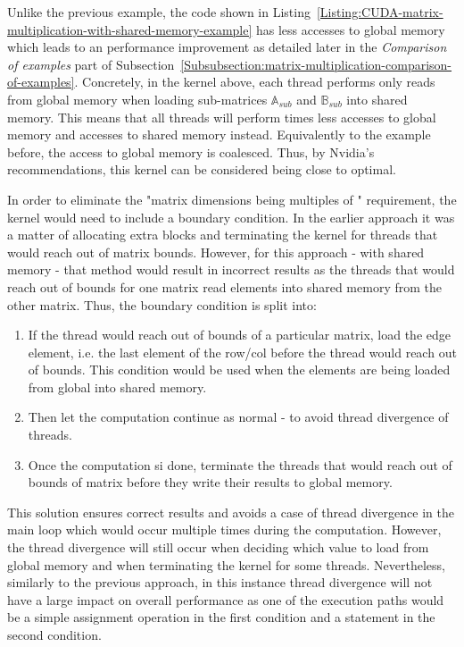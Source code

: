 Unlike the previous example, the code shown in Listing~\ref{Listing:CUDA-matrix-multiplication-with-shared-memory-example} has less accesses to global memory which leads to an performance improvement as detailed later in the \textit{Comparison of examples} part of Subsection~\ref{Subsubsection:matrix-multiplication-comparison-of-examples}. Concretely, in the kernel above, each thread performs only  reads from global memory when loading sub-matrices $ \mathbb{A}_{sub} $ and $ \mathbb{B}_{sub} $ into shared memory. This means that all threads will perform  times less accesses to global memory and  accesses to shared memory instead. Equivalently to the example before, the access to global memory is coalesced. Thus, by Nvidia's recommendations, this kernel can be considered being close to optimal.

\par In order to eliminate the "matrix dimensions being multiples of " requirement, the kernel would need to include a boundary condition. In the earlier approach it was a matter of allocating extra blocks and terminating the kernel for threads that would reach out of matrix bounds. However, for this approach - with shared memory - that method would result in incorrect results as the threads that would reach out of bounds for one matrix read elements into shared memory from the other matrix. Thus, the boundary condition is split into:

\begin{enumerate}
	\item If the thread would reach out of bounds of a particular matrix, load the edge element, i.e. the last element of the row/col before the thread would reach out of bounds. This condition would be used when the elements are being loaded from global into shared memory.
	\item Then let the computation continue as normal - to avoid thread divergence of threads.
	\item Once the computation si done, terminate the threads that would reach out of bounds of matrix  before they write their results to global memory.
\end{enumerate}

This solution ensures correct results and avoids a case of thread divergence in the main loop which would occur multiple times during the computation. However, the thread divergence will still occur when deciding which value to load from global memory and when terminating the kernel for some threads. Nevertheless, similarly to the previous approach, in this instance thread divergence will not have a large impact on overall performance as one of the execution paths would be a simple assignment operation in the first condition and a  statement in the second condition.

